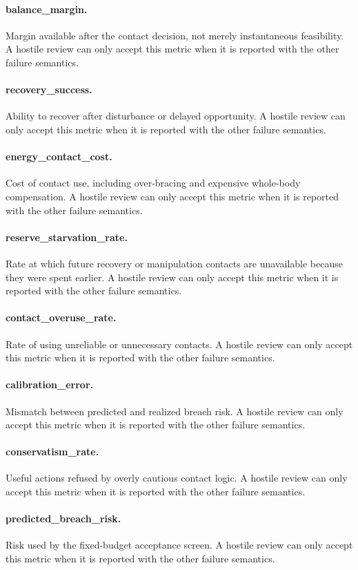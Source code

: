 \documentclass{article}
\begin{document}
\paragraph{balance\_margin.} Margin available after the contact decision, not merely instantaneous feasibility. A hostile review can only accept this metric when it is reported with the other failure semantics.
\paragraph{recovery\_success.} Ability to recover after disturbance or delayed opportunity. A hostile review can only accept this metric when it is reported with the other failure semantics.
\paragraph{energy\_contact\_cost.} Cost of contact use, including over-bracing and expensive whole-body compensation. A hostile review can only accept this metric when it is reported with the other failure semantics.
\paragraph{reserve\_starvation\_rate.} Rate at which future recovery or manipulation contacts are unavailable because they were spent earlier. A hostile review can only accept this metric when it is reported with the other failure semantics.
\paragraph{contact\_overuse\_rate.} Rate of using unreliable or unnecessary contacts. A hostile review can only accept this metric when it is reported with the other failure semantics.
\paragraph{calibration\_error.} Mismatch between predicted and realized breach risk. A hostile review can only accept this metric when it is reported with the other failure semantics.
\paragraph{conservatism\_rate.} Useful actions refused by overly cautious contact logic. A hostile review can only accept this metric when it is reported with the other failure semantics.
\paragraph{predicted\_breach\_risk.} Risk used by the fixed-budget acceptance screen. A hostile review can only accept this metric when it is reported with the other failure semantics.
\end{document}
